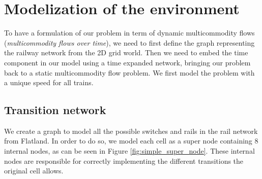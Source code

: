 \documentclass[14pt,a4paper]{article}
\theoremstyle{definition}
\numberwithin{equation}{subsection}
\begin{document}
\newpage
\section{Modelization of the environment}

To have a formulation of our problem in term of dynamic multicommodity flows (\emph{multicommodity flows over time}), we need to first define the graph representing the railway network from the 2D grid world. Then we need to embed the time component in our model using a time expanded network, bringing our problem back to a static multicommodity flow problem.
We first model the problem with a unique speed for all trains.

\subsection{Transition network}

We create a graph to model all the possible switches and rails in the rail network from Flatland. In order to do so, we model each cell as a super node containing 8 internal nodes, as can be seen in Figure \ref{fig:simple_super_node}. These internal nodes are responsible for correctly implementing the different transitions the original cell allows. 
\end{document}
